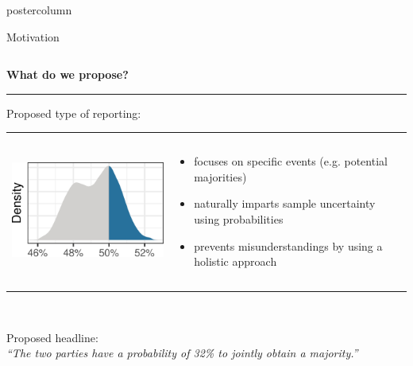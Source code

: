 \documentclass[final,hyperref={pdfpagelabels=false}]{beamer}
\let\olditem\item
\renewcommand\item{\justifying\olditem} %
\newcommand{\bfBlue}[1]{\textcolor{koaladarkestblue}{\textbf{#1}}}
\newcommand{\blue}[1]{\textcolor{koaladarkestblue}{#1}}
\newcommand{\darkgray}[1]{\textcolor{koaladarkgray}{#1}}
\newcommand{\lightgray}[1]{\textcolor{koalagray}{#1}}
\newcommand{\colHeader}[1]{
  \vspace{-3ex}
  \begin{center}\centering
  \bfBlue{#1}
  \end{center}
  \vspace{-2ex}
  \textcolor{koalablue}{\hrule{}}
  \vspace{2ex}
}
\begin{document}
\begin{frame}
\begin{columns}
\begin{column}{1\textwidth}
\begin{beamercolorbox}[center,wd=\textwidth]{postercolumn}
\begin{minipage}[T]{.95\textwidth}
\begin{block}{\footnotesize Motivation}
\begin{columns}[t]

  \begin{column}{.475\textwidth}
  \colHeader{What do we propose?}
  Proposed type of reporting: \\[1cm]
  \begin{tabular}{p{9cm}p{25cm}}
  \includegraphics[height=5cm]{figures/motivation_density_highlighted}
  &
  \vspace{-4.8cm}
  \begin{itemize}
    \item focuses on specific events (e.g. potential majorities)
    \item naturally imparts sample uncertainty using probabilities
    \item prevents misunderstandings by using a holistic approach
  \end{itemize}
  \end{tabular}
  \\[10px]
  \begin{mdleftblue}
  \begin{minipage}{\textwidth}
  \lightgray{\footnotesize Proposed headline:}
  \\
  \vspace{-50px}
  \textit{\darkgray{``The two parties have a} \blue{probability of 32\%} \darkgray{to jointly obtain a majority.''}}
  \\[17px]
  \end{minipage}
  \end{mdleftblue}
  \vspace{50px}


\end{column}
\end{columns}
\end{block}
\end{minipage}
\end{beamercolorbox}
\end{column}
\end{columns}
\end{frame}
\end{document}
